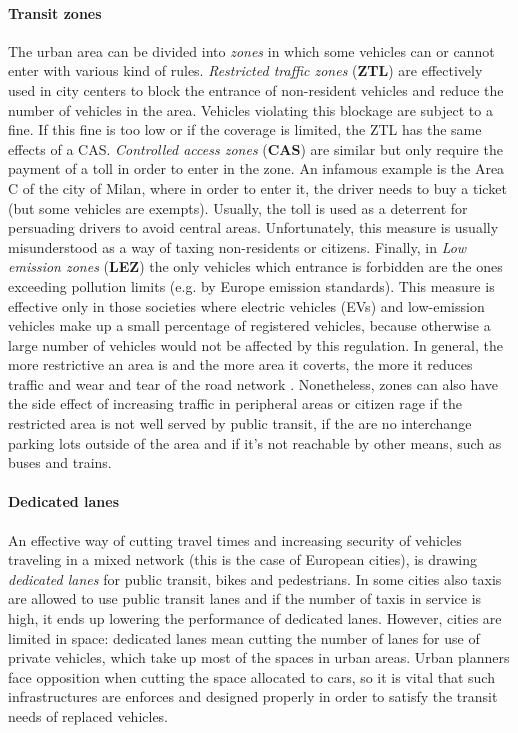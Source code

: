 \paragraph{Transit zones}

The urban area can be divided into \textit{zones} in which some vehicles can or cannot enter with various kind of rules.
\textit{Restricted traffic zones} (\textbf{ZTL}) are effectively used in city centers to block the entrance of non-resident vehicles and reduce the number of vehicles in the area. Vehicles violating this blockage are subject to a fine. If this fine is too low or if the coverage is limited, the ZTL has the same effects of a CAS.
\textit{Controlled access zones} (\textbf{CAS}) are similar but only require the payment of a toll in order to enter in the zone. An infamous example is the Area C of the city of Milan, where in order to enter it, the driver needs to buy a ticket (but some vehicles are exempts). Usually, the toll is used as a deterrent for persuading drivers to avoid central areas. Unfortunately, this measure is usually misunderstood as a way of taxing non-residents or citizens.
Finally, in \textit{Low emission zones} (\textbf{LEZ}) the only vehicles which entrance is forbidden are the ones exceeding pollution limits (e.g. by Europe emission standards). This measure is effective only in those societies where electric vehicles (EVs) and low-emission vehicles make up a small percentage of registered vehicles, because otherwise a large number of vehicles would not be affected by this regulation.
In general, the more restrictive an area is and the more area it coverts, the more it reduces traffic and wear and tear of the road network \cite{derobertis2016traffic}. Nonetheless, zones can also have the side effect of increasing traffic in peripheral areas or citizen rage if the restricted area is not well served by public transit, if the are no interchange parking lots outside of the area and if it's not reachable by other means, such as buses and trains.

\paragraph{Dedicated lanes}

An effective way of cutting travel times and increasing security of vehicles traveling in a mixed network (this is the case of European cities), is drawing \textit{dedicated lanes} for public transit, bikes and pedestrians. In some cities also taxis are allowed to use public transit lanes and if the number of taxis in service is high, it ends up lowering the performance of dedicated lanes. However, cities are limited in space: dedicated lanes mean cutting the number of lanes for use of private vehicles, which take up most of the spaces in urban areas. Urban planners face opposition when cutting the space allocated to cars, so it is vital that such infrastructures are enforces and designed properly in order to satisfy the transit needs of replaced vehicles.

